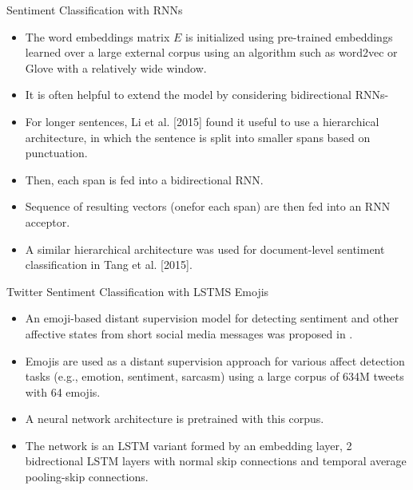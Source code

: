 \documentclass[handout]{beamer}
\begin{document}
\begin{frame}{Sentiment Classification with RNNs}
\begin{scriptsize}
\begin{itemize}
\item The word embeddings matrix $E$ is initialized using pre-trained embeddings learned over a large external corpus using an algorithm such as word2vec or Glove with a relatively wide window.
\item It is often helpful to extend the model by considering bidirectional RNNs-
\item For longer sentences, Li et al. [2015] found it useful to use a hierarchical architecture, in which the sentence is split into smaller spans based on punctuation.
\item Then, each span is fed into a bidirectional RNN. 
\item Sequence of resulting vectors (onefor each span) are then fed into an RNN acceptor.
\item A similar hierarchical architecture was used for document-level sentiment classification in Tang et al. [2015].
\end{itemize}
\end{scriptsize}
\end{frame}



\begin{frame}{Twitter Sentiment Classification with LSTMS Emojis}
\begin{scriptsize}
\begin{itemize}
\item An emoji-based distant supervision model for detecting sentiment and other affective states from short social media messages was proposed in \cite{FelboMSRL17}.
\item Emojis are used as a distant supervision approach for various affect detection tasks (e.g., emotion, sentiment, sarcasm) using a large corpus of 634M tweets with 64 emojis.
\item A neural network architecture is pretrained with this corpus. 
\item The network is an LSTM variant formed by an embedding layer, 2 bidrectional LSTM layers with normal skip connections and temporal average pooling-skip connections.
\end{itemize}
\end{scriptsize}
\end{frame}
\end{document}
